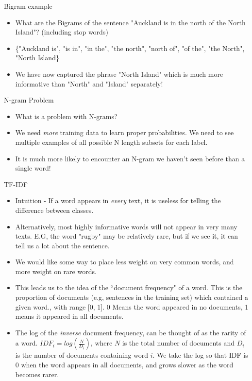 \documentclass[aspectratio=169, 10pt]{beamer}
\begin{document}
\begin{frame}{Bigram example}
\begin{itemize}
    \item What are the Bigrams of the sentence "Auckland is in the north of the North Island"? (including stop words)
    \pause
    \item \{"Auckland is", "is in", "in the", "the north", "north of", "of the", "the North", "North Island\}
    \item We have now captured the phrase "North Island" which is much more informative than "North" and "Island" separately!
\end{itemize}
\end{frame}

\begin{frame}{N-gram Problem}
\begin{itemize}
    \item What is a problem with N-grams?
    \pause
    \item We need \textit{more} training data to learn proper probabilities. We need to see multiple examples of all possible N length subsets for each label.
    \item It is much more likely to encounter an N-gram we haven't seen before than a single word!
\end{itemize}
\end{frame}

\begin{frame}{TF-IDF}
    \begin{itemize}
        \item Intuition - If a word appears in \textit{every} text, it is useless for telling the difference between classes.
        \item Alternatively, most highly informative words will not appear in very many texts. E.G, the word "rugby" may be relatively rare, but if we see it, it can tell us a lot about the sentence.
        \item We would like some way to place less weight on very common words, and more weight on rare words.
        \item This leads us to the idea of the ``document frequency" of a word. This is the proportion of documents (e.g, sentences in the training set) which contained a given word., with range [0, 1]. 0 Means the word appeared in no documents, 1 means it appeared in all documents.
        \item The log of the \textit{inverse} document frequency, can be thought of as the rarity of a word. $IDF_i = log(\frac{N}{D_i})$, where $N$ is the total number of documents and $D_i$ is the number of documents containing word $i$. We take the log so that IDF is 0 when the word appears in all documents, and grows slower as the word becomes rarer.
    \end{itemize}
\end{frame}
\end{document}
